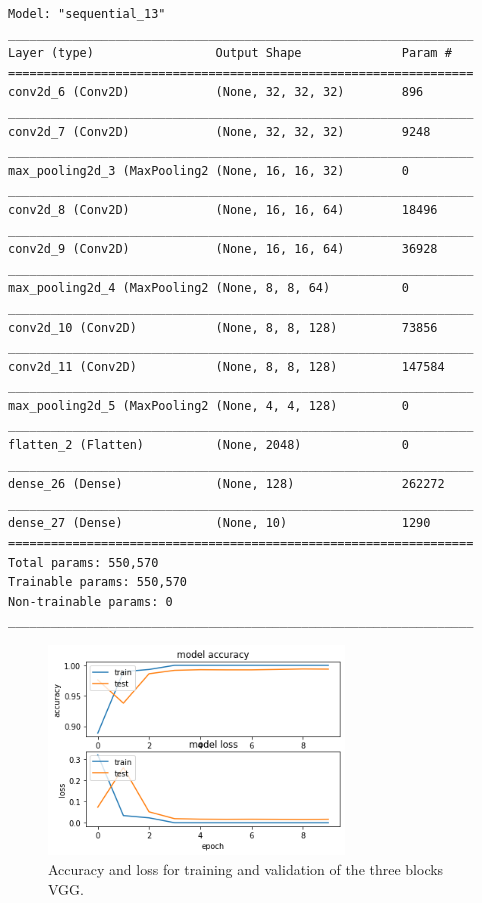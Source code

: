 \documentclass[10pt,english, openany]{book}
\begin{document}
\begin{verbatim}
Model: "sequential_13"
_________________________________________________________________
Layer (type)                 Output Shape              Param #   
=================================================================
conv2d_6 (Conv2D)            (None, 32, 32, 32)        896       
_________________________________________________________________
conv2d_7 (Conv2D)            (None, 32, 32, 32)        9248      
_________________________________________________________________
max_pooling2d_3 (MaxPooling2 (None, 16, 16, 32)        0         
_________________________________________________________________
conv2d_8 (Conv2D)            (None, 16, 16, 64)        18496     
_________________________________________________________________
conv2d_9 (Conv2D)            (None, 16, 16, 64)        36928     
_________________________________________________________________
max_pooling2d_4 (MaxPooling2 (None, 8, 8, 64)          0         
_________________________________________________________________
conv2d_10 (Conv2D)           (None, 8, 8, 128)         73856     
_________________________________________________________________
conv2d_11 (Conv2D)           (None, 8, 8, 128)         147584    
_________________________________________________________________
max_pooling2d_5 (MaxPooling2 (None, 4, 4, 128)         0         
_________________________________________________________________
flatten_2 (Flatten)          (None, 2048)              0         
_________________________________________________________________
dense_26 (Dense)             (None, 128)               262272    
_________________________________________________________________
dense_27 (Dense)             (None, 10)                1290      
=================================================================
Total params: 550,570
Trainable params: 550,570
Non-trainable params: 0
_________________________________________________________________
\end{verbatim}

\begin{figure}[H]
    \centering
    \includegraphics[width=0.7\textwidth]{Images/2.4 Accuracy Loss VGG 3.png}
    \caption{\label{fig:5.6}Accuracy and loss for training and validation of the three blocks VGG.}
\end{figure}
\end{document}

